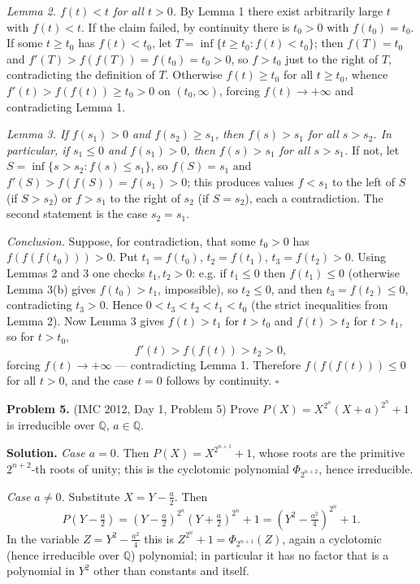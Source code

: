 \documentclass{article}
\newcommand{\Q}{\mathbb{Q}}
\begin{document}
\emph{Lemma 2. \( f(t) < t \) for all \( t > 0 \).}
By Lemma 1 there exist arbitrarily large \( t \) with \( f(t) < t \). If the claim failed, by continuity there is \( t_0 > 0 \) with \( f(t_0) = t_0 \). If some \( t \geq t_0 \) has \( f(t) < t_0 \), let \( T = \inf\{ t \geq t_0 : f(t) < t_0 \} \); then \( f(T) = t_0 \) and \( f'(T) > f(f(T)) = f(t_0) = t_0 > 0 \), so \( f > t_0 \) just to the right of \( T \), contradicting the definition of \( T \). Otherwise \( f(t) \geq t_0 \) for all \( t \geq t_0 \), whence \( f'(t) > f(f(t)) \geq t_0 > 0 \) on \( (t_0, \infty) \), forcing \( f(t) \to +\infty \) and contradicting Lemma 1.

\emph{Lemma 3. If \( f(s_1) > 0 \) and \( f(s_2) \geq s_1 \), then \( f(s) > s_1 \) for all \( s > s_2 \). In particular, if \( s_1 \leq 0 \) and \( f(s_1) > 0 \), then \( f(s) > s_1 \) for all \( s > s_1 \).}
If not, let \( S = \inf\{ s > s_2 : f(s) \leq s_1 \} \), so \( f(S) = s_1 \) and \( f'(S) > f(f(S)) = f(s_1) > 0 \); this produces values \( f < s_1 \) to the left of \( S \) (if \( S > s_2 \)) or \( f > s_1 \) to the right of \( s_2 \) (if \( S = s_2 \)), each a contradiction. The second statement is the case \( s_2 = s_1 \).

\emph{Conclusion.} Suppose, for contradiction, that some \( t_0 > 0 \) has \( f(f(f(t_0))) > 0 \). Put \( t_1 = f(t_0) \), \( t_2 = f(t_1) \), \( t_3 = f(t_2) > 0 \). Using Lemmas 2 and 3 one checks \( t_1, t_2 > 0 \): e.g. if \( t_1 \leq 0 \) then \( f(t_1) \leq 0 \) (otherwise Lemma 3(b) gives \( f(t_0) > t_1 \), impossible), so \( t_2 \leq 0 \), and then \( t_3 = f(t_2) \leq 0 \), contradicting \( t_3 > 0 \). Hence \( 0 < t_3 < t_2 < t_1 < t_0 \) (the strict inequalities from Lemma 2). Now Lemma 3 gives \( f(t) > t_1 \) for \( t > t_0 \) and \( f(t) > t_2 \) for \( t > t_1 \), so for \( t > t_0 \),
\[
f'(t) > f(f(t)) > t_2 > 0,
\]
forcing \( f(t) \to +\infty \) --- contradicting Lemma 1. Therefore \( f(f(f(t))) \leq 0 \) for all \( t > 0 \), and the case \( t = 0 \) follows by continuity. \hfill\(\square\)

\bigskip
\textbf{Problem 5.} (IMC 2012, Day 1, Problem 5)
Prove \( P(X) = X^{2^n}(X + a)^{2^n} + 1 \) is irreducible over \( \Q \), \( a \in \Q \).

\textbf{Solution.}
\emph{Case \( a = 0 \).} Then \( P(X) = X^{2^{n+1}} + 1 \), whose roots are the primitive \( 2^{n+2} \)-th roots of unity; this is the cyclotomic polynomial \( \Phi_{2^{n+2}} \), hence irreducible.

\emph{Case \( a \neq 0 \).} Substitute \( X = Y - \tfrac{a}{2} \). Then
\[
P\!\left(Y - \tfrac{a}{2}\right) = \left(Y - \tfrac{a}{2}\right)^{2^n}\left(Y + \tfrac{a}{2}\right)^{2^n} + 1 = \left(Y^2 - \tfrac{a^2}{4}\right)^{2^n} + 1.
\]
In the variable \( Z = Y^2 - \tfrac{a^2}{4} \) this is \( Z^{2^n} + 1 = \Phi_{2^{n+1}}(Z) \), again a cyclotomic (hence irreducible over \( \Q \)) polynomial; in particular it has no factor that is a polynomial in \( Y^2 \) other than constants and itself.
\end{document}
